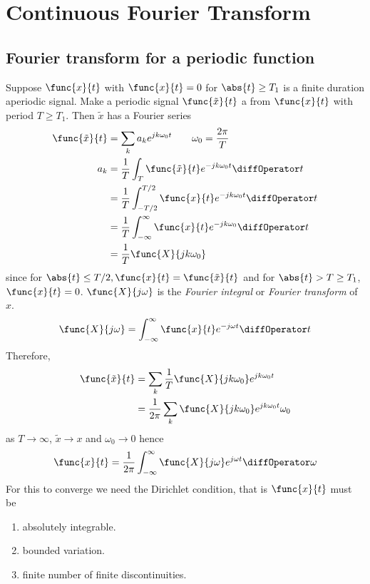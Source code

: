 \chapter{Continuous Fourier Transform}
\section{Fourier transform for a periodic function}
Suppose \(\func{x}{t}\) with \(\func{x}{t} = 0\) for \(\abs{t} \geq T_1\) is a finite duration aperiodic signal. Make a periodic signal \(\func{\tilde{x}}{t}\) a from \(\func{x}{t}\) with period \(T \geq T_1\). Then \(\tilde{x}\) has a Fourier series 
\begin{align*}
    \func{\tilde{x}}{t} &= \sum_k a_k e^{jk\omega_0 t} \qquad \omega_0 = \dfrac{2\pi}{T}\\
    a_k &= \dfrac{1}{T} \int_T \func{\tilde{x}}{t} e^{-jk\omega_0 t} \diffOperator t\\
    &= \dfrac{1}{T} \int_{-T/2}^{T/2} \func{x}{t} e^{-jk\omega_0 t} \diffOperator t \\
    &= \dfrac{1}{T} \int_{-\infty}^{\infty} \func{x}{t} e^{-jk\omega_0} \diffOperator t \\
    &= \dfrac{1}{T} \func{X}{jk\omega_0}
\end{align*}
since for \(\abs{t} \leq T/2, \func{x}{t} = \func{\tilde{x}}{t}\) and for \(\abs{t} > T \geq T_1\), \(\func{x}{t} = 0\). \(\func{X}{j\omega}\) is the \textit{Fourier integral} or \textit{Fourier transform} of \(x\). 
\begin{equation*}
    \func{X}{j\omega} = \int_{-\infty}^{\infty} \func{x}{t} e^{-j\omega t} \diffOperator t
\end{equation*}
Therefore, 
\begin{align*}
    \func{\tilde{x}}{t} &= \sum_k \dfrac{1}{T} \func{X}{jk\omega_0} e^{jk\omega_0 t}\\
    &= \dfrac{1}{2\pi} \sum_k \func{X}{jk\omega_0} e^{jk\omega_0 t} \omega_0
\end{align*}
as \(T \to \infty\), \(\tilde{x} \to x\) and \(\omega_0 \to 0\) hence 
\begin{equation*}
    \func{x}{t} = \dfrac{1}{2\pi} \int_{-\infty}^{\infty} \func{X}{j\omega} e^{j\omega t} \diffOperator \omega
\end{equation*}
For this to converge we need the Dirichlet condition, that is \(\func{x}{t}\) must be 
\begin{enumerate}
    \item absolutely integrable.
    \item bounded variation.
    \item finite number of finite discontinuities.
\end{enumerate}

